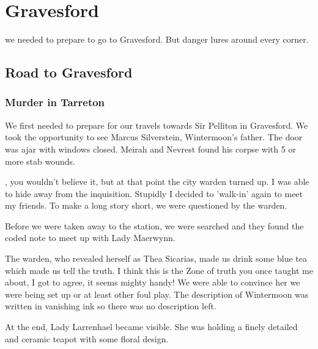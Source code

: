 \chapter{Gravesford}
\label{diary__road_to_gravesford}

 we needed to prepare to go to Gravesford. But danger lures around every corner.

\section{Road to Gravesford}
\subsection*{Murder in Tarreton}
We first needed to prepare for our travels towards Sir Pelliton in Gravesford. We took the opportunity to see Marcus Silverstein, Wintermoon's father. The door was ajar with windows closed. Meirah and Nevrest found his corpse with 5 or more stab wounds.

\Master{}, you wouldn't believe it, but at that point the city warden turned up. I was able to hide away from the inquisition. Stupidly I decided to 'walk-in' again to meet my friends. To make a long story short, we were questioned by the warden.

\begin{DndReadAloud}
    Before we were taken away to the station, we were searched and they found the coded note to meet up with Lady Maerwynn.
\end{DndReadAloud}

The warden, who revealed herself as Thea Sicarias, made us drink some blue tea which made us tell the truth. I think this is the Zone of truth you once taught me about, I got to agree, it seems mighty handy! We were able to convince her we were being set up or at least other foul play. The description of Wintermoon was written in vanishing ink so there was no description left.

At the end, Lady Larrenhael became visible. She was holding a finely detailed and ceramic teapot with some floral design.

